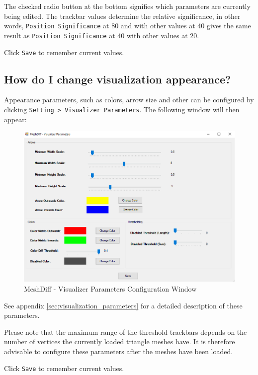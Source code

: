 The checked radio button at the bottom signifies which parameters are currently being edited. The trackbar values determine the relative significance, in other words, \verb+Position Significance+ at 80 and with other values at 40 gives the same result as \verb+Position Significance+ at 40 with other values at 20.

Click \verb+Save+ to remember current values.

\subsection{How do I change visualization appearance?}

Appearance parameters, such as colors, arrow size and other can be configured by clicking \verb+Setting > Visualizer Parameters+. The following window will then appear:

\begin{figure}[h]
\centering
\includegraphics[width=1\textwidth]{./img/meshdiff-visualizer_parameters.PNG}
\caption[MeshDiff - Visualizer Parameters]{MeshDiff - Visualizer Parameters Configuration Window}
\label{fig:meshdiff_visualizer_parameters}
\end{figure}

See appendix \ref{sec:visualization_parameters} for a detailed description of these parameters.

Please note that the maximum range of the threshold trackbars depends on the number of vertices the currently loaded triangle meshes have. It is therefore advisable to configure these parameters after the meshes have been loaded.

Click \verb+Save+ to remember current values.

